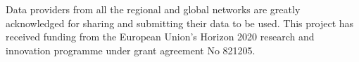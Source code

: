 \documentclass[journal abbreviation, manuscript]{copernicus}
\begin{document}



\begin{acknowledgements}
 Data providers from all the regional and global networks are greatly acknowledged for sharing and submitting their data to be used. This project has received funding from the European Union’s Horizon 2020 research and innovation programme under grant agreement No 821205.
\end{acknowledgements}


















\end{document}
